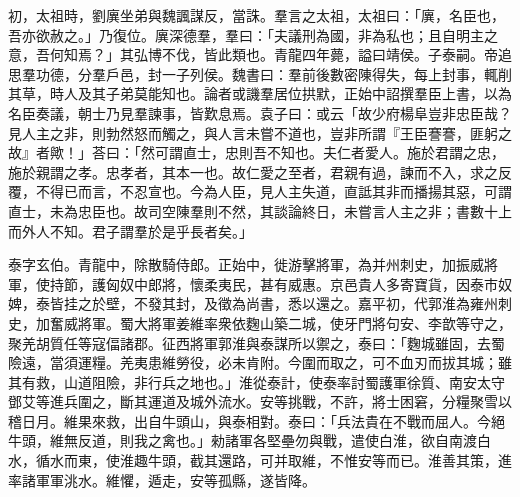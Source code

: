 \begin{pinyinscope}
初，太祖時，劉廙坐弟與魏諷謀反，當誅。羣言之太祖，太祖曰：「廙，名臣也，吾亦欲赦之。」乃復位。廙深德羣，羣曰：「夫議刑為國，非為私也；且自明主之意，吾何知焉？」其弘博不伐，皆此類也。青龍四年薨，謚曰靖侯。子泰嗣。帝追思羣功德，分羣戶邑，封一子列侯。魏書曰：羣前後數密陳得失，每上封事，輒削其草，時人及其子弟莫能知也。論者或譏羣居位拱默，正始中詔撰羣臣上書，以為名臣奏議，朝士乃見羣諫事，皆歎息焉。袁子曰：或云「故少府楊阜豈非忠臣哉？見人主之非，則勃然怒而觸之，與人言未嘗不道也，豈非所謂『王臣謇謇，匪躬之故』者歟！」荅曰：「然可謂直士，忠則吾不知也。夫仁者愛人。施於君謂之忠，施於親謂之孝。忠孝者，其本一也。故仁愛之至者，君親有過，諫而不入，求之反覆，不得已而言，不忍宣也。今為人臣，見人主失道，直詆其非而播揚其惡，可謂直士，未為忠臣也。故司空陳羣則不然，其談論終日，未嘗言人主之非；書數十上而外人不知。君子謂羣於是乎長者矣。」

泰字玄伯。青龍中，除散騎侍郎。正始中，徙游擊將軍，為并州刺史，加振威將軍，使持節，護匈奴中郎將，懷柔夷民，甚有威惠。京邑貴人多寄寶貨，因泰市奴婢，泰皆挂之於壁，不發其封，及徵為尚書，悉以還之。嘉平初，代郭淮為雍州刺史，加奮威將軍。蜀大將軍姜維率衆依麴山築二城，使牙門將句安、李歆等守之，聚羌胡質任等寇偪諸郡。征西將軍郭淮與泰謀所以禦之，泰曰：「麴城雖固，去蜀險遠，當須運糧。羌夷患維勞役，必未肯附。今圍而取之，可不血刃而拔其城；雖其有救，山道阻險，非行兵之地也。」淮從泰計，使泰率討蜀護軍徐質、南安太守鄧艾等進兵圍之，斷其運道及城外流水。安等挑戰，不許，將士困窘，分糧聚雪以稽日月。維果來救，出自牛頭山，與泰相對。泰曰：「兵法貴在不戰而屈人。今絕牛頭，維無反道，則我之禽也。」勑諸軍各堅壘勿與戰，遣使白淮，欲自南渡白水，循水而東，使淮趣牛頭，截其還路，可并取維，不惟安等而已。淮善其策，進率諸軍軍洮水。維懼，遁走，安等孤縣，遂皆降。


\end{pinyinscope}
